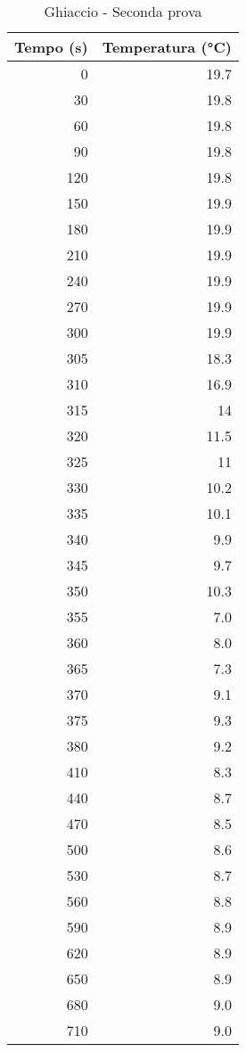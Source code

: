 \documentclass[10pt,twocolumn]{article}
\begin{document}
\begin{table}[H]
\label{tab:temp}
\hfill
\begin{minipage}{.45\textwidth}
        \vspace{-20.8cm}
        \centering
    \caption*{Ghiaccio - Seconda prova}
\begin{tabular}{|r|r|}
\hline
Tempo (s) & Temperatura (°C) \\
\hline
0 & 19.7 \\ \hline
30 & 19.8 \\ \hline
60 & 19.8 \\ \hline
90 & 19.8 \\ \hline
120 & 19.8 \\ \hline
150 & 19.9 \\ \hline
180 & 19.9 \\ \hline
210 & 19.9 \\ \hline
240 & 19.9 \\ \hline
270 & 19.9 \\ \hline
300 & 19.9 \\ \hline
305 & 18.3 \\ \hline
310 & 16.9 \\ \hline
315 & 14 \\ \hline
320 & 11.5 \\ \hline
325 & 11 \\ \hline
330 & 10.2 \\ \hline
335 & 10.1 \\ \hline
340 & 9.9 \\ \hline
345 & 9.7 \\ \hline
350 & 10.3 \\ \hline
355 & 7.0 \\ \hline
360 & 8.0 \\ \hline
365 & 7.3 \\ \hline
370 & 9.1 \\ \hline
375 & 9.3 \\ \hline
380 & 9.2 \\ \hline
410 & 8.3 \\ \hline
440 & 8.7 \\ \hline
470 & 8.5 \\ \hline
500 & 8.6 \\ \hline
530 & 8.7 \\ \hline
560 & 8.8 \\ \hline
590 & 8.9 \\ \hline
620 & 8.9 \\ \hline
650 & 8.9 \\ \hline
680 & 9.0 \\ \hline
710 & 9.0 \\ \hline

\end{tabular}
\end{minipage}
\end{table}
\end{document}
